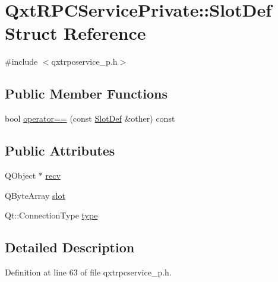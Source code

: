 \hypertarget{struct_qxt_r_p_c_service_private_1_1_slot_def}{\section{Qxt\-R\-P\-C\-Service\-Private\-:\-:Slot\-Def Struct Reference}
\label{struct_qxt_r_p_c_service_private_1_1_slot_def}
}


{\ttfamily \#include $<$qxtrpcservice\-\_\-p.\-h$>$}

\subsection*{Public Member Functions}
\begin{DoxyCompactItemize}
\item 
bool \hyperlink{struct_qxt_r_p_c_service_private_1_1_slot_def_a4b514d569a6fb69f7c4ee2a260bc20db}{operator==} (const \hyperlink{struct_qxt_r_p_c_service_private_1_1_slot_def}{Slot\-Def} \&other) const 
\end{DoxyCompactItemize}
\subsection*{Public Attributes}
\begin{DoxyCompactItemize}
\item 
Q\-Object $\ast$ \hyperlink{struct_qxt_r_p_c_service_private_1_1_slot_def_a031d0c74314367e8bfbc974abf9df773}{recv}
\item 
Q\-Byte\-Array \hyperlink{struct_qxt_r_p_c_service_private_1_1_slot_def_a05d5efc2b86c89e33ab7bb632c6562d3}{slot}
\item 
Qt\-::\-Connection\-Type \hyperlink{struct_qxt_r_p_c_service_private_1_1_slot_def_a6f2cb1ed2eec6558038a6e49ba50bd5f}{type}
\end{DoxyCompactItemize}


\subsection{Detailed Description}


Definition at line 63 of file qxtrpcservice\-\_\-p.\-h.



